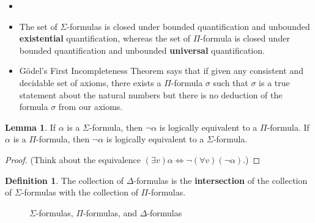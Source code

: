 \documentclass[11pt,letterpaper]{book}
\theoremstyle{definition}
\newtheorem{definition}{Definition}[section]
\newtheorem{lemma}{Lemma}[section]
\begin{document}
\begin{itemize}
\item[]
\item{The set of $\Sigma$-formulas is closed under bounded
quantification and unbounded \textbf{existential} quantification,
whereas the set of $\Pi $-formula is closed under bounded quantification
and unbounded \textbf{universal} quantification.}
\item{G\"odel's First Incompleteness Theorem says that if given any
consistent and decidable set of axioms, there exists a $\Pi$-formula
$\sigma$ such that $\sigma$ is a true statement about the natural
numbers but there is no deduction of the formula $\sigma$ from our axioms.}
\end{itemize}

\begin{lemma}
If $\alpha$ is a $\Sigma$-formula, then $\lnot \alpha$ is logically equivalent to a $\Pi$-formula. If $\alpha$ is a $\Pi$-formula, then $\lnot \alpha$ is logically equivalent to a $\Sigma$-formula. 
\end{lemma}

\begin{proof}
(Think about the equivalence $(\exists v) \alpha \iff  \lnot (\forall v) ( \lnot
\alpha ) $.)
\end{proof}

\begin{definition}\label{def:Delta_formulas}
The collection of $\Delta$-formulas is the \textbf{intersection} of the
collection of $\Sigma$-formulas with the collection of $\Pi$-formulas.

\end{definition}

\begin{figure}
\centering
{}
\caption{$\Sigma$-formulas, $\Pi$-formulas, and $\Delta$-formulas}\label{fig:Sigma_Pi_Delta_formulas}
\end{figure}
\end{document}
